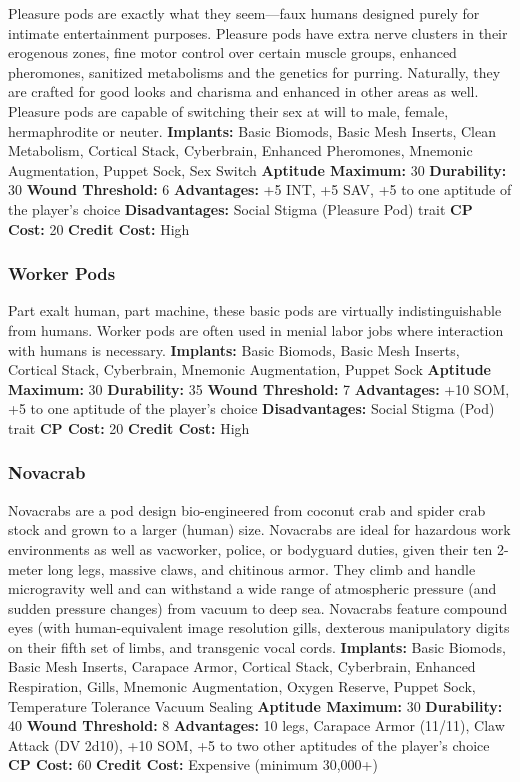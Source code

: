 Pleasure pods are exactly what they seem—faux 
humans designed purely for intimate entertainment 
purposes. Pleasure pods have extra nerve clusters in 
their erogenous zones, fine motor control over certain 
muscle groups, enhanced pheromones, sanitized metabolisms
and the genetics for purring. Naturally, they
are crafted for good looks and charisma and enhanced 
in other areas as well. Pleasure pods are capable of 
switching their sex at will to male, female, hermaphrodite
or neuter.
\textbf{Implants: }Basic Biomods, Basic Mesh Inserts, Clean 
Metabolism, Cortical Stack, Cyberbrain, Enhanced 
Pheromones, Mnemonic Augmentation, Puppet 
Sock, Sex Switch
\textbf{Aptitude Maximum: }30
\textbf{Durability:} 30
\textbf{Wound Threshold:} 6
\textbf{Advantages:} +5 INT, +5 SAV, +5 to one aptitude of the 
player's choice
\textbf{Disadvantages: }Social Stigma (Pleasure Pod) trait
\textbf{CP Cost: }20
\textbf{Credit Cost: }High

\subsubsection{Worker Pods}

Part exalt human, part machine, these basic pods are 
virtually indistinguishable from humans. Worker pods 
are often used in menial labor jobs where interaction 
with humans is necessary.
\textbf{Implants: }Basic Biomods, Basic Mesh Inserts, Cortical
Stack, Cyberbrain, Mnemonic Augmentation,
Puppet Sock
\textbf{Aptitude Maximum: }30
\textbf{Durability: }35
\textbf{Wound Threshold:} 7
\textbf{Advantages: }+10 SOM, +5 to one aptitude of the 
player's choice
\textbf{Disadvantages: }Social Stigma (Pod) trait
\textbf{CP Cost:} 20
\textbf{Credit Cost: }High

\subsubsection{Novacrab}

Novacrabs are a pod design bio-engineered from 
coconut crab and spider crab stock and grown to a 
larger (human) size. Novacrabs are ideal for hazardous
work environments as well as vacworker, police,
or bodyguard duties, given their ten 2-meter long legs, 
massive claws, and chitinous armor. They climb and 
handle microgravity well and can withstand a wide 
range of atmospheric pressure (and sudden pressure 
changes) from vacuum to deep sea. Novacrabs feature 
compound eyes (with human-equivalent image resolution
gills, dexterous manipulatory digits on their fifth
set of limbs, and transgenic vocal cords.
\textbf{Implants: }Basic Biomods, Basic Mesh Inserts, Carapace
Armor, Cortical Stack, Cyberbrain, Enhanced
Respiration, Gills, Mnemonic Augmentation, 
Oxygen Reserve, Puppet Sock, Temperature Tolerance
Vacuum Sealing
\textbf{Aptitude Maximum: }30
\textbf{Durability:} 40
\textbf{Wound Threshold:} 8
\textbf{Advantages:} 10 legs, Carapace Armor (11/11), Claw 
Attack (DV 2d10), +10 SOM, +5 to two other aptitudes
of the player's choice
\textbf{CP Cost:} 60
\textbf{Credit Cost: }Expensive (minimum 30,000+)

